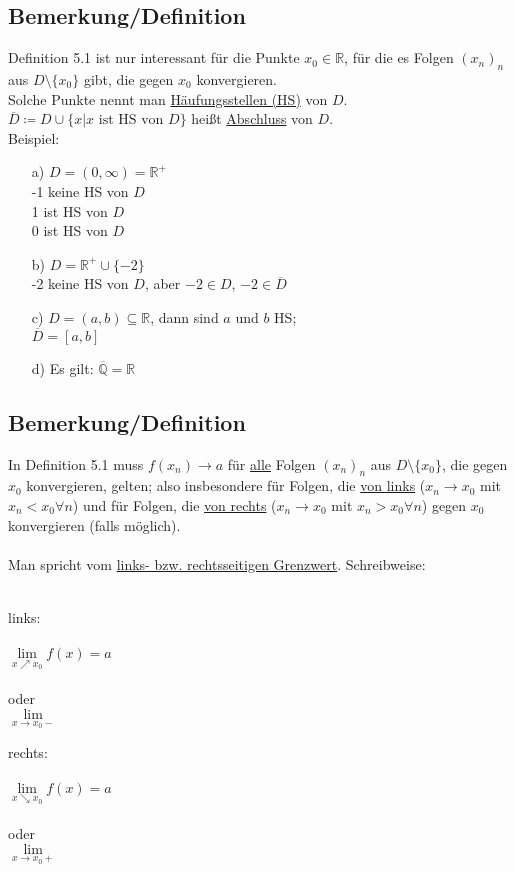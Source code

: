 \documentclass[12pt, titlepage]{article}
\newcommand{\R}{\mathds{R}}
\renewcommand{\>}{\rightarrow}
\renewcommand{\*}{\cdot}
\begin{document}
	\subsection{Bemerkung/Definition}
	Definition 5.1 ist nur interessant für die Punkte $x_0\in\R$, für die es Folgen $(x_n)_n$ aus $D\setminus\{x_0\}$ gibt, die gegen $x_0$ konvergieren.\\
	Solche Punkte nennt man \underline{Häufungsstellen (HS)} von $D$.\\
	$\overline{D}\coloneqq D\cup\{x|x\textrm{ ist HS von }D\}$ heißt \underline{Abschluss} von $D$.\\
	Beispiel:
	\begin{itemize}
		\item[a)] $D=(0,\infty)=\R^+$\\
		-1 keine HS von $D$\\
		1 ist HS von $D$\\
		0 ist HS von $D$
		\item[b)] $D=\R^+\cup\{-2\}$\\
		-2 keine HS von $D$, aber $-2\in D$, $-2\in\overline{D}$
		\item[c)] $D=(a,b)\subseteq\R$, dann sind $a$ und $b$ HS;\\
		$\overline{D}=[a,b]$
		\item[d)] Es gilt: $\overline{\mathds{Q}}=\R$ 
	\end{itemize}
	\subsection{Bemerkung/Definition}
	In Definition 5.1 muss $f(x_n)\> a$ für \underline{alle} Folgen $(x_n)_n$ aus $D\setminus\{x_0\}$, die gegen $x_0$ konvergieren, gelten; also insbesondere für Folgen, die \underline{von links} ($x_n\> x_0$ mit $x_n<x_0\forall n$) und für Folgen, die \underline{von rechts} ($x_n\> x_0$ mit $x_n>x_0\forall n$) gegen $x_0$ konvergieren (falls möglich).\\
	\\
	Man spricht vom \underline{links- bzw. rechtsseitigen Grenzwert}. Schreibweise:\\
	\\
	\begin{minipage}[c]{0.5\textwidth}
		links:\\
		\\
		$\lim\limits_{x\nearrow x_0}f(x)=a$\\
		\\
		oder\\
		$\lim\limits_{x\> x_0-}$
	\end{minipage}
	\begin{minipage}[c]{0.5\textwidth}
		rechts:\\
		\\
		$\lim\limits_{x\searrow x_0}f(x)=a$\\
		\\
		oder\\
		$\lim\limits_{x\> x_0+}$
	\end{minipage}
\end{document}
